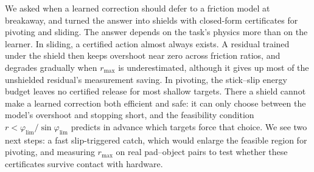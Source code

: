 We asked when a learned correction should defer to a friction model at breakaway, and turned the answer into shields with closed-form certificates for pivoting and sliding. The answer depends on the task's physics more than on the learner. In sliding, a certified action almost always exists. A residual trained under the shield then keeps overshoot near zero across friction ratios, and degrades gradually when $r_{\max}$ is underestimated, although it gives up most of the unshielded residual's measurement saving. In pivoting, the stick--slip energy budget leaves no certified release for most shallow targets. There a shield cannot make a learned correction both efficient and safe: it can only choose between the model's overshoot and stopping short, and the feasibility condition $r<\varphi_{\lim}/\sin\varphi_{\lim}$ predicts in advance which targets force that choice. We see two next steps: a fast slip-triggered catch, which would enlarge the feasible region for pivoting, and measuring $r_{\max}$ on real pad--object pairs to test whether these certificates survive contact with hardware.

